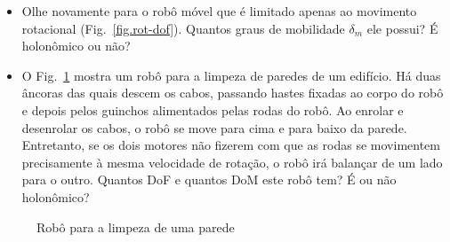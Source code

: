 \begin{framed}
\begin{itemize}
\item Olhe novamente para o robô móvel que é limitado apenas ao movimento rotacional (Fig.~\ref{fig.rot-dof}). Quantos graus de mobilidade $\delta_m$ ele possui? É holonômico ou não?
\item O Fig.~\ref{fig.wallcleaning} mostra um robô para a limpeza de paredes de um edifício. Há duas âncoras das quais descem os cabos, passando hastes fixadas ao corpo do robô e depois pelos guinchos alimentados pelas rodas do robô. Ao enrolar e desenrolar os cabos, o robô se move para cima e para baixo da parede. Entretanto, se os dois motores não fizerem com que as rodas se movimentem precisamente à mesma velocidade de rotação, o robô irá balançar de um lado para o outro. Quantos DoF e quantos DoM este robô tem? É ou não holonômico?
\end{itemize}
\end{framed}


\begin{figure}
\begin{center}
\end{center}
\caption{Robô para a limpeza de uma parede}\label{fig.wallcleaning}
\end{figure}

